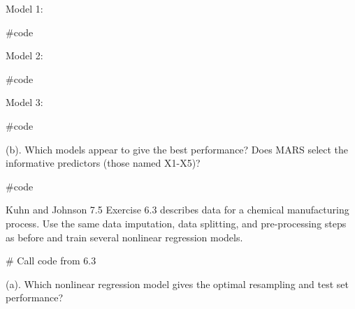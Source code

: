 \documentclass[openany]{report}
\newenvironment{Shaded}{\begin{snugshade}}{\end{snugshade}}
\newcommand{\CommentTok}[1]{\textcolor[rgb]{0.50,0.62,0.50}{#1}}
\begin{document}
Model 1:

\begin{Shaded}
\begin{Highlighting}[]
\CommentTok{#code}
\end{Highlighting}
\end{Shaded}

Model 2:

\begin{Shaded}
\begin{Highlighting}[]
\CommentTok{#code}
\end{Highlighting}
\end{Shaded}

Model 3:

\begin{Shaded}
\begin{Highlighting}[]
\CommentTok{#code}
\end{Highlighting}
\end{Shaded}

\begin{subquestion}{(b).}
Which models appear to give the best performance? Does MARS select the informative predictors (those named X1-X5)?
\end{subquestion}

\begin{Shaded}
\begin{Highlighting}[]
\CommentTok{#code}
\end{Highlighting}
\end{Shaded}


\begin{question}{Kuhn and Johnson 7.5}
Exercise 6.3 describes data for a chemical manufacturing process. Use the same data imputation, data splitting, and pre-processing steps as before and train several nonlinear regression models.
\end{question}

\begin{Shaded}
\begin{Highlighting}[]
\CommentTok{# Call code from 6.3}
\end{Highlighting}
\end{Shaded}

\begin{subquestion}{(a).}
Which nonlinear regression model gives the optimal resampling and test set performance? 
\end{subquestion}
\end{document}

